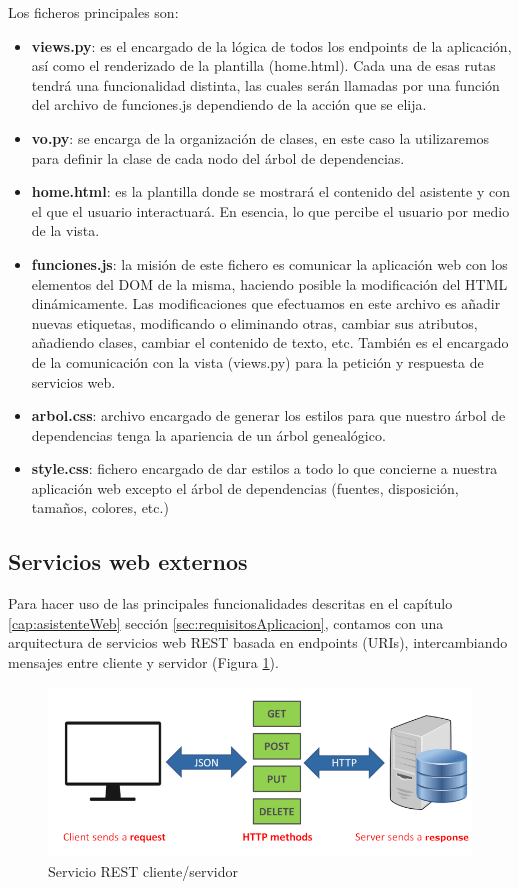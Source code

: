 Los ficheros principales son:
\begin{itemize}
	\item \textbf{views.py}: es el encargado de la lógica de todos los endpoints de la aplicación, así como el renderizado de la plantilla (home.html). Cada una de esas rutas tendrá una funcionalidad distinta, las cuales serán llamadas por una función del archivo de funciones.js dependiendo de la acción que se elija.
	\item \textbf{vo.py}: se encarga de la organización de clases, en este caso la utilizaremos para definir la clase de cada nodo del árbol de dependencias.
	\item \textbf{home.html}: es la plantilla donde se mostrará el contenido del asistente y con el que el usuario interactuará. En esencia, lo que percibe el usuario por medio de la vista.
	\item \textbf{funciones.js}: la misión de este fichero es comunicar la aplicación web con los elementos del DOM de la misma, haciendo posible la modificación del HTML dinámicamente. Las modificaciones que efectuamos en este archivo es añadir nuevas etiquetas, modificando o eliminando otras, cambiar sus atributos, añadiendo clases, cambiar el contenido de texto, etc. También es el encargado de la comunicación con la vista (views.py) para la petición y respuesta de servicios web.
	\item \textbf{arbol.css}: archivo encargado de generar los estilos para que nuestro árbol de dependencias tenga la apariencia de un árbol genealógico.
	\item \textbf{style.css}: fichero encargado de dar estilos a todo lo que concierne a nuestra aplicación web excepto el árbol de dependencias (fuentes, disposición, tamaños, colores, etc.)   
\end{itemize}

\subsection{Servicios web externos}\label{sec:serviciosWebExternos}
Para hacer uso de las principales funcionalidades descritas en el capítulo \ref{cap:asistenteWeb} sección \ref{sec:requisitosAplicacion}, contamos con una arquitectura de servicios web REST basada en endpoints (URIs), intercambiando mensajes entre cliente y servidor (Figura \ref{fig:apiRest}). 

\begin{figure}[h!]
	\centering
	
	
	\includegraphics[scale=0.4]{Imagenes/Figuras/rest_api}
	
	
	\caption{Servicio REST cliente/servidor}
	\label{fig:apiRest}
\end{figure}

